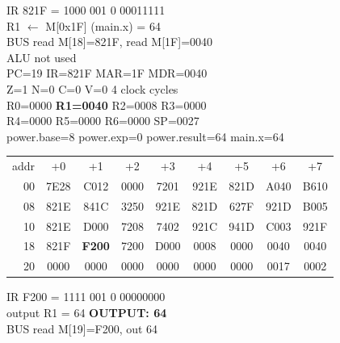 \noindent\begin{tcolorbox}[stepbox, title={Step 38 \hfill PC 18 \quad LD R1, main.x}]
\textcolor{dim}{IR} 821F = 1000 001 0 00011111\\
R1 $\leftarrow$ M[0x1F] (main.x) = 64\\
\textcolor{dim}{BUS} read M[18]=821F, read M[1F]=0040\\
\textcolor{dim}{ALU} \textcolor{dim}{not used}\\
PC=19 IR=821F MAR=1F MDR=0040\\
Z=1 N=0 C=0 V=0 \hfill \textcolor{dim}{4 clock cycles}\\
R0=0000 \textcolor{wrt}{\textbf{R1=0040}} R2=0008 R3=0000\\
R4=0000 R5=0000 R6=0000 SP=0027\\
\textcolor{dim}{power.base=8  power.exp=0  power.result=64  main.x=64}\\[1pt]
{\setlength{\tabcolsep}{1.6pt}\begin{tabular}{@{}r*{8}{c}@{}}
\textcolor{dim}{addr} & \textcolor{dim}{+0} & \textcolor{dim}{+1} & \textcolor{dim}{+2} & \textcolor{dim}{+3} & \textcolor{dim}{+4} & \textcolor{dim}{+5} & \textcolor{dim}{+6} & \textcolor{dim}{+7}\\
\textcolor{dim}{00} & 7E28 & C012 & 0000 & 7201 & 921E & 821D & A040 & B610\\
\textcolor{dim}{08} & 821E & 841C & 3250 & 921E & 821D & 627F & 921D & B005\\
\textcolor{dim}{10} & 821E & D000 & 7208 & 7402 & 921C & 941D & C003 & 921F\\
\textcolor{dim}{18} & 821F & \cellcolor{pcc}\textbf{F200} & 7200 & D000 & \cellcolor{datac}0008 & \cellcolor{datac}0000 & \cellcolor{datac}0040 & \cellcolor{datac}0040\\
\textcolor{dim}{20} & \cellcolor{stackc}0000 & \cellcolor{stackc}0000 & \cellcolor{stackc}0000 & \cellcolor{stackc}0000 & \cellcolor{stackc}0000 & \cellcolor{stackc}0000 & \cellcolor{stackc}0017 & \cellcolor{stackc}0002\\
\end{tabular}}
\end{tcolorbox}\hfill\begin{tcolorbox}[stepbox, title={Step 39 \hfill PC 19 \quad OUT R1}]
\textcolor{dim}{IR} F200 = 1111 001 0 00000000\\
output R1 = 64 \hfill \colorbox{outc}{\textbf{OUTPUT: 64}}\\
\textcolor{dim}{BUS} read M[19]=F200, out 64\\

\end{tcolorbox}
